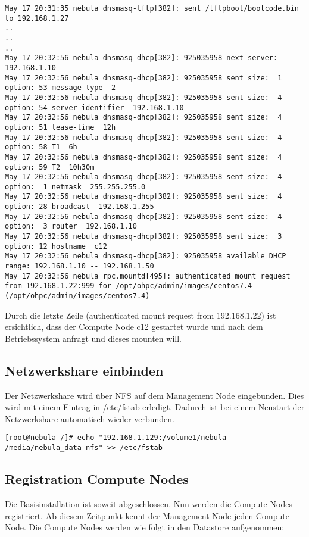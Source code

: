 \begin{lstlisting}
May 17 20:31:35 nebula dnsmasq-tftp[382]: sent /tftpboot/bootcode.bin to 192.168.1.27
..
..
..
May 17 20:32:56 nebula dnsmasq-dhcp[382]: 925035958 next server: 192.168.1.10
May 17 20:32:56 nebula dnsmasq-dhcp[382]: 925035958 sent size:  1 option: 53 message-type  2
May 17 20:32:56 nebula dnsmasq-dhcp[382]: 925035958 sent size:  4 option: 54 server-identifier  192.168.1.10
May 17 20:32:56 nebula dnsmasq-dhcp[382]: 925035958 sent size:  4 option: 51 lease-time  12h
May 17 20:32:56 nebula dnsmasq-dhcp[382]: 925035958 sent size:  4 option: 58 T1  6h
May 17 20:32:56 nebula dnsmasq-dhcp[382]: 925035958 sent size:  4 option: 59 T2  10h30m
May 17 20:32:56 nebula dnsmasq-dhcp[382]: 925035958 sent size:  4 option:  1 netmask  255.255.255.0
May 17 20:32:56 nebula dnsmasq-dhcp[382]: 925035958 sent size:  4 option: 28 broadcast  192.168.1.255
May 17 20:32:56 nebula dnsmasq-dhcp[382]: 925035958 sent size:  4 option:  3 router  192.168.1.10
May 17 20:32:56 nebula dnsmasq-dhcp[382]: 925035958 sent size:  3 option: 12 hostname  c12
May 17 20:32:56 nebula dnsmasq-dhcp[382]: 925035958 available DHCP range: 192.168.1.10 -- 192.168.1.50
May 17 20:32:56 nebula rpc.mountd[495]: authenticated mount request from 192.168.1.22:999 for /opt/ohpc/admin/images/centos7.4 (/opt/ohpc/admin/images/centos7.4)
\end{lstlisting}

Durch die letzte Zeile (authenticated mount request from 192.168.1.22) ist ersichtlich, dass der Compute Node c12 gestartet wurde und nach dem Betriebssystem anfragt und dieses mounten will.
\newpage

\subsection{Netzwerkshare einbinden}

Der Netzwerkshare wird über NFS auf dem Management Node eingebunden. Dies wird mit einem Eintrag in /etc/fstab erledigt. Dadurch ist bei einem Neustart der Netzwerkshare automatisch wieder verbunden.
\begin{lstlisting}
[root@nebula /]# echo "192.168.1.129:/volume1/nebula /media/nebula_data nfs" >> /etc/fstab
\end{lstlisting}

\subsection{Registration Compute Nodes}

Die Basisinstallation ist soweit abgeschlossen. Nun werden die Compute Nodes registriert. Ab diesem Zeitpunkt kennt der Management Node jeden Compute Node. Die Compute Nodes werden wie folgt in den Datastore aufgenommen:

